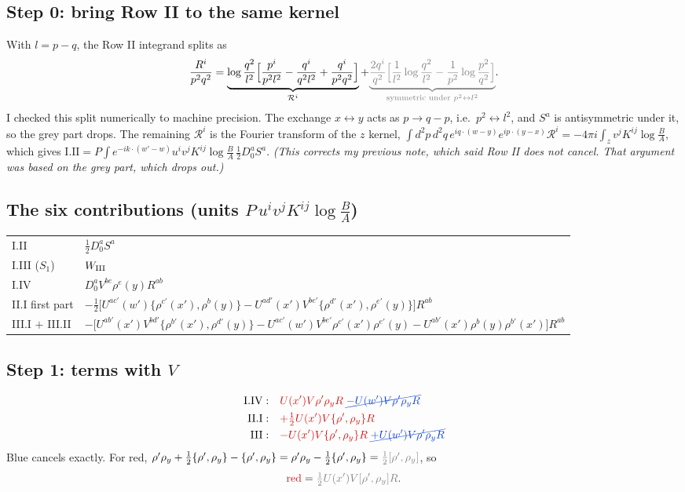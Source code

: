 \documentclass[10pt]{article}
\newcommand{\R}[1]{{\color{cR}#1}}
\newcommand{\B}[1]{{\color{cB}#1}}
\newcommand{\Gr}[1]{{\color{cX}#1}}
\begin{document}
\subsection*{Step 0: bring Row II to the same kernel}
With $l=p-q$, the Row II integrand splits as
\begin{equation}
\frac{R^{i}}{p^{2}q^{2}}=\underbrace{\log\frac{q^{2}}{l^{2}}\Big[\frac{p^{i}}{p^{2}l^{2}}-\frac{q^{i}}{q^{2}l^{2}}+\frac{q^{i}}{p^{2}q^{2}}\Big]}_{\mathcal R^{i}}+\Gr{\underbrace{\frac{2q^{i}}{q^{2}}\Big[\frac{1}{l^{2}}\log\frac{q^{2}}{l^{2}}-\frac{1}{p^{2}}\log\frac{p^{2}}{q^{2}}\Big]}_{\text{symmetric under }p^{2}\leftrightarrow l^{2}}}.
\end{equation}
I checked this split numerically to machine precision. The exchange $x\leftrightarrow y$ acts as $p\to q-p$, i.e.\ $p^{2}\leftrightarrow l^{2}$, and $S^{a}$ is antisymmetric under it, so the \Gr{grey} part drops. The remaining $\mathcal R^{i}$ is the Fourier transform of the $z$ kernel, $\int d^{2}p\,d^{2}q\,e^{iq\cdot(w-y)}e^{ip\cdot(y-x)}\mathcal R^{i}=-4\pi i\int_{z}v^{j}K^{ij}\log\frac{B}{A}$, which gives $\text{I.II}=P\int e^{-ik\cdot(w'-w)}u^{i}v^{j}K^{ij}\log\frac BA\,\tfrac12D_{0}^{a}S^{a}$. \emph{(This corrects my previous note, which said Row II does not cancel. That argument was based on the grey part, which drops out.)}

\subsection*{The six contributions (units $P\,u^{i}v^{j}K^{ij}\log\frac{B}{A}$)}
\begin{tabular}{ll}
I.II & $\tfrac12D_{0}^{a}S^{a}$\\
I.III ($S_{1}$) & $W_{\rm III}$\\
I.IV & $D_{0}^{a}V^{be}\rho^{e}(y)R^{ab}$\\
II.I first part & $-\tfrac12\big[U^{ac'}(w')\{\rho^{c'}(x'),\rho^{b}(y)\}-U^{ad'}(x')V^{be'}\{\rho^{d'}(x'),\rho^{e'}(y)\}\big]R^{ab}$\\
III.I $+$ III.II & $-\big[U^{ab'}(x')V^{bd'}\{\rho^{b'}(x'),\rho^{d'}(y)\}-U^{ac'}(w')V^{be'}\rho^{c'}(x')\rho^{e'}(y)-U^{ab'}(x')\rho^{b}(y)\rho^{b'}(x')\big]R^{ab}$
\end{tabular}

\subsection*{Step 1: terms with $V$}
\begin{align}
\text{I.IV}:&\quad \R{U(x')V\rho'\rho_{y}R}\;\B{\cancel{-U(w')V\rho'\rho_{y}R}}\notag\\
\text{II.I}:&\quad \R{+\tfrac12U(x')V\{\rho',\rho_{y}\}R}\notag\\
\text{III}:&\quad \R{-U(x')V\{\rho',\rho_{y}\}R}\;\B{\cancel{+U(w')V\rho'\rho_{y}R}}
\end{align}
\B{Blue} cancels exactly. For \R{red}, $\rho'\rho_{y}+\tfrac12\{\rho',\rho_{y}\}-\{\rho',\rho_{y}\}=\rho'\rho_{y}-\tfrac12\{\rho',\rho_{y}\}=\Gr{\tfrac12[\rho',\rho_{y}]}$, so
\begin{equation}
\R{\text{red}}=\Gr{\tfrac12U(x')V[\rho',\rho_{y}]R}.
\end{equation}
\end{document}
